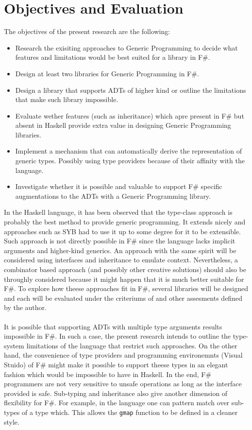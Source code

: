 \documentclass[8pt]{extarticle}
\begin{document}
\section{Objectives and Evaluation}
The objectives of the present research are the following:
\begin{itemize}
\item Research the exisiting approaches to Generic Programming to decide what features and limitations would be best suited for a library in F\#.
\item Design at least two libraries for Generic Programming in F\#.
\item Design a library that supports ADTs of higher kind or outline the limitations that make such library impossible.
\item Evaluate wether features (such as inheritance) which apre present in F\# but absent in Haskell provide extra value in designing Generic Programming libraries.
\item Implement a mechanism that can automatically derive the representation of generic types. Possibly using type providers because of their affinity with the language.
\item Investigate whether it is possible and valuable to support F\# specific augmentations to the ADTs with a Generic Programming library.
\end{itemize}
In the Haskell language, it has been observed that the type-class approach is probably the best method to provide generic programming. It extends nicely\cite{SYB,CompGen} and approaches such as SYB had to use it up to some degree for it to be extensible. Such approach is not directly possible in F\# since the language lacks implicit arguments and higher-kind generics. An approach with the same spirit will be considered using interfaces and inheritance to emulate context. Nevertheless, a combinator based approach (and possibly other creative solutions) should also be throughly considered because it might happen that it is much better suitable for F\#. To explore how theese approaches fit in F\#, several libraries will be designed and each will be evaluated under the criteriums of \cite{CompGen} and other assesments defined by the author.
\\\\
It is possible that supporting ADTs with multiple type arguments results impossible in F\#. In such a case, the present research intends to outline the type-system limitations of the language that restrict such approaches. On the other hand, the convenience of type providers and programming environemnts (Visual Stuido) of F\# might make it possible to support theese types in an elegant fashion which would be impossible to have in Haskell. In the end, F\# programmers are not very sensitive to unsafe operations as long as the interface provided is safe. Sub-typing and inheritance also give another dimension of flexibility for F\#. For example, in the language one can pattern match over sub-types of a type which. This allows the \verb+gmap+ function to be defined in a cleaner style\cite{RegularFSharp}.
\end{document}
